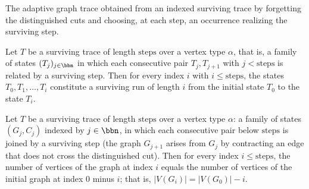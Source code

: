\begin{definition}
\label{KargerTrace.survivingTrace_toGraphTrace}
\leanok
{}
The adaptive graph trace obtained from an indexed surviving trace by forgetting the
distinguished cuts and choosing, at each step, an occurrence realizing the surviving step.
\end{definition}

\begin{lemma}
\label{KargerTrace.survivingTrace_prefix_run}
\leanok
{}
Let $T$ be a surviving trace of length $\text{steps}$ over a vertex type $\alpha$, that
is, a family of states $(T_j)_{j \in \bbn}$ in which each consecutive pair $T_j,
T_{j+1}$ with $j < \text{steps}$ is related by a surviving step. Then for every index
$i$ with $i \le \text{steps}$, the states $T_0, T_1, \dots, T_i$ constitute a surviving
run of length $i$ from the initial state $T_0$ to the state $T_i$.
\end{lemma}

\begin{lemma}
\label{KargerTrace.survivingTrace_vertexCount_eq}
\leanok
{}
Let $T$ be a surviving trace of length $\mathrm{steps}$ over a vertex type $\alpha$: a
family of states $(G_j, C_j)$ indexed by $j \in \bbn$, in which each consecutive pair
below $\mathrm{steps}$ is joined by a surviving step (the graph $G_{j+1}$ arises from
$G_j$ by contracting an edge that does not cross the distinguished cut). Then for every
index $i \le \mathrm{steps}$, the number of vertices of the graph at index $i$ equals
the number of vertices of the initial graph at index $0$ minus $i$; that is, $\lvert
V(G_i)\rvert = \lvert V(G_0)\rvert - i$.
\end{lemma}

